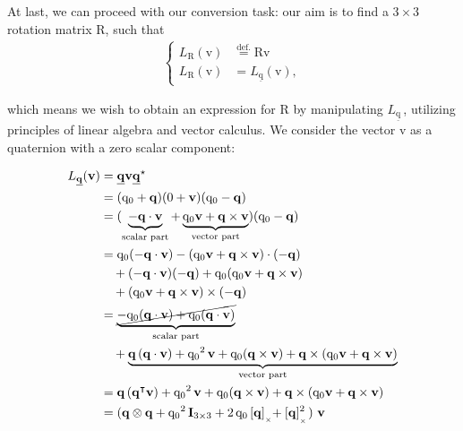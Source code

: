 \setlength{\belowdisplayskip}{0.3cm}

\bigskip At last, we can proceed with our conversion task: our aim is to find a $3\times3$ rotation matrix $\bm{\mathrm{R}}$, such that
\begin{align*}
\left\{
    \begin{aligned}
    	L_{\bm{\mathrm{R}}}(\bm{\mathrm{v}}) &\stackrel{\text{def.}}{=} \bm{\mathrm{R}}\bm{\mathrm{v}} \\
        L_{\bm{\mathrm{R}}}(\bm{\mathrm{v}}) &= L_{\underline{\bm{\mathrm{q}}}}(\bm{\mathrm{v}}),
    \end{aligned}
\right.
\end{align*}

\noindent which means we wish to obtain an expression for $\bm{\mathrm{R}}$ by manipulating $L_{\underline{\bm{\mathrm{q}}}}\,$, utilizing principles of linear algebra and vector calculus. We consider the vector $\bm{\mathrm{v}}$ as a quaternion with a zero scalar component:


\begin{align*}
    L_{\underline{\bm{\mathrm{q}}}}(\bm{\mathrm{v}}) &= \underline{\bm{\mathrm{q}}}\bm{\mathrm{v}}\underline{\bm{\mathrm{q}}}^\star \\
    &= (\mathrm{q}_0+\bm{\mathrm{q}})(0+\bm{\mathrm{v}})(\mathrm{q}_0-\bm{\mathrm{q}}) \\
    &= (\underbrace{-\bm{\mathrm{q}}\cdot\bm{\mathrm{v}}}_{\text{scalar part}} + \underbrace{\mathrm{q}_0\bm{\mathrm{v}}+\bm{\mathrm{q}}\times\bm{\mathrm{v}}}_{\text{vector part}})(\mathrm{q}_0-\bm{\mathrm{q}}) \\
    &= \mathrm{q}_0(-\bm{\mathrm{q}}\cdot\bm{\mathrm{v}}) - (\mathrm{q}_0\bm{\mathrm{v}}+\bm{\mathrm{q}}\times\bm{\mathrm{v}})\cdot(-\bm{\mathrm{q}}) \\
    &\quad + (-\bm{\mathrm{q}}\cdot\bm{\mathrm{v}})(-\bm{\mathrm{q}}) + \mathrm{q}_0(\mathrm{q}_0\bm{\mathrm{v}}+\bm{\mathrm{q}}\times\bm{\mathrm{v}}) \\
    &\quad + (\mathrm{q}_0\bm{\mathrm{v}}+\bm{\mathrm{q}}\times\bm{\mathrm{v}})\times(-\bm{\mathrm{q}}) \\
    &= \underbrace{\cancel{-\mathrm{q}_0(\bm{\mathrm{q}}\cdot\bm{\mathrm{v}}) + \mathrm{q}_0(\bm{\mathrm{q}}\cdot\bm{\mathrm{v}})}}_{\text{scalar part}} \\
    &\quad + \underbrace{\bm{\mathrm{q}}\,(\bm{\mathrm{q}}\cdot\bm{\mathrm{v}}) + {\mathrm{q}_0}^2\,\bm{\mathrm{v}} + \mathrm{q}_0(\bm{\mathrm{q}}\times\bm{\mathrm{v}}) + \bm{\mathrm{q}}\times(\mathrm{q}_0\bm{\mathrm{v}}+\bm{\mathrm{q}}\times\bm{\mathrm{v}})}_{\text{vector part}} \\
    &= \bm{\mathrm{q}}\,(\bm{\mathrm{q}}^\intercal\bm{\mathrm{v}}) + {\mathrm{q}_0}^2\,\bm{\mathrm{v}} + \mathrm{q}_0(\bm{\mathrm{q}}\times\bm{\mathrm{v}}) + \bm{\mathrm{q}}\times(\mathrm{q}_0\bm{\mathrm{v}}+\bm{\mathrm{q}}\times\bm{\mathrm{v}}) \\
    &= (\bm{\mathrm{q}}\otimes\bm{\mathrm{q}} + {\mathrm{q}_0}^2\,\bm{\mathrm{I}}_{3\times3} + 2\,\mathrm{q}_0\,[\bm{\mathrm{q}}]_{_{_\times}}\!\! + [\bm{\mathrm{q}}]_{_{_\times}}^2)\,\,\bm{\mathrm{v}}
\end{align*}

